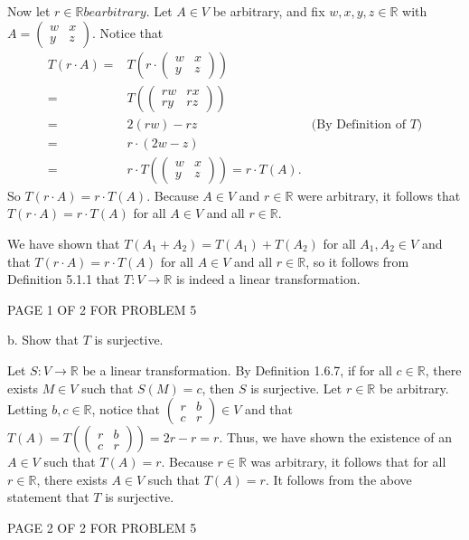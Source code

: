 \documentclass[12pt]{article}
\newenvironment{problem}[2][Problem]
{
	\begin{trivlist} 
		\item[\hskip \labelsep {\bfseries #1 #2:}]
	}
{
	\end{trivlist}
	}
\newenvironment{solution}[1][Solution]
{
	\begin{trivlist} 
		\item[\hskip \labelsep {\itshape #1:}]
	}
	{
	\end{trivlist}
}
\begin{document}
\begin{problem}{5}
\begin{solution}
Now let $r \in \mathbb{R} be arbitrary$. Let $A \in V$ be arbitrary, and fix $w,x,y,z \in \mathbb{R}$ with $A = \begin{pmatrix} w&x\\y&z \end{pmatrix}$. Notice that
\begin{align*}
T(r\cdot A) =& T\left( r\cdot \begin{pmatrix} w&x\\y&z \end{pmatrix} \right) &\\
=& T\left( \begin{pmatrix} rw&rx\\ry&rz \end{pmatrix} \right) &\\
=& 2(rw)-rz &\text{(By Definition of $T$)}\\
=&r\cdot (2w-z) &\\
=& r\cdot T\left( \begin{pmatrix} w&x\\y&z \end{pmatrix} \right) = r\cdot T(A). &
\end{align*}
So $T(r\cdot A) = r\cdot T(A)$. Because $A \in V$ and $r\in \mathbb{R}$ were arbitrary, it follows that $T(r\cdot A) = r\cdot T(A)$ for all $A \in V$ and all $r\in \mathbb{R}$.

We have shown that $T(A_1+A_2) = T(A_1) + T(A_2)$ for all $A_1,A_2 \in V$ and that $T(r\cdot A) = r\cdot T(A)$ for all $A \in V$ and all $r \in \mathbb{R}$, so it follows from Definition 5.1.1 that $T: V \to \mathbb{R}$ is indeed a linear transformation.
\end{solution}
\vfill
\centerline{PAGE 1 OF 2 FOR PROBLEM 5}
\newpage
b. Show that $T$ is surjective.
\begin{solution}
Let $S:V \to \mathbb{R}$ be a linear transformation. By Definition 1.6.7, if for all $c \in \mathbb{R}$, there exists $M \in V$ such that $S(M)=c$, then $S$ is surjective.
Let $r \in \mathbb{R}$ be arbitrary. Letting $b,c \in \mathbb{R}$, notice that $\begin{pmatrix} r&b\\c&r \end{pmatrix} \in V$ and that $T(A) = T\left( \begin{pmatrix} r&b\\c&r \end{pmatrix} \right)=2r-r=r$. Thus, we have shown the existence of an $A \in V$ such that $T(A) = r$. Because $r \in \mathbb{R}$ was arbitrary, it follows that for all $r \in \mathbb{R}$, there exists $A \in V$ such that $T(A)=r$. It follows from the above statement that $T$ is surjective.
\end{solution}
\vfill
\centerline{PAGE 2 OF 2 FOR PROBLEM 5}
\end{problem}
\end{document}
